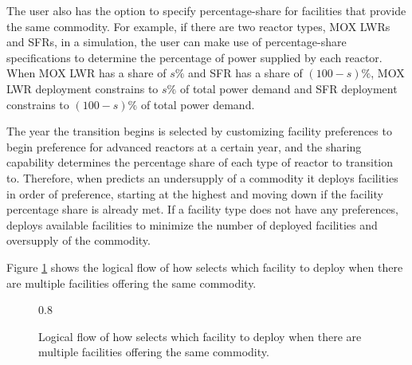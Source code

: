 The user also has the option to specify percentage-share for facilities 
that provide the same commodity. 
For example, if there are two reactor types, \gls{MOX} LWRs and SFRs, in a simulation,
the user can make use of percentage-share specifications to determine the 
percentage of power supplied by each reactor.   
When MOX LWR has a share of $s\%$ and 
\gls{SFR} has a share of $(100-s)\%$, 
MOX LWR deployment constrains to $s\%$ of total power demand 
and SFR deployment constrains to $(100-s)\%$ of total power demand.  

The year the transition begins is selected by customizing facility 
preferences to begin preference for advanced reactors at a certain year,
and the sharing capability determines the percentage 
share of each type of reactor to transition to. 
Therefore, when \deploy predicts an undersupply of a commodity 
it deploys facilities in order of preference, starting at 
the highest and moving down if the facility percentage share 
is already met. 
If a facility type does not have any preferences, \deploy 
deploys available facilities to minimize the number of deployed 
facilities and oversupply of the commodity.


Figure \ref{fig:deployflow} shows the logical flow of how \deploy 
selects which facility to deploy when there are multiple facilities 
offering the same commodity. 

\begin{figure}[]
	\centering
	\resizebox{\textwidth} {0.8\height}{
	}
    \caption{Logical flow of how \deploy 
	selects which facility to deploy when there are multiple facilities 
	offering the same commodity.}
	\label{fig:deployflow}
\end{figure}

